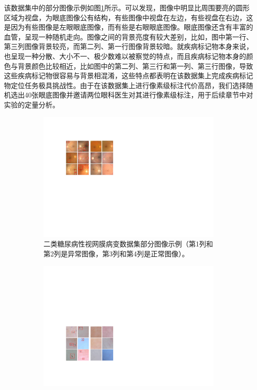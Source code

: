 该数据集中的部分图像示例如图\ref{subfig:bin_dr_ds_example}所示。可以发现，图像中明显比周围要亮的圆形区域为视盘，为眼底图像公有结构，有些图像中视盘在左边，有些视盘在右边，这是因为有些图像是左眼眼底图像，而有些是右眼眼底图像。眼底图像还含有丰富的血管，呈现一种随机走向。图像之间的背景亮度有较大差别，比如，图中第一行、第三列图像背景较亮，而第二列、第一行图像背景较暗。就疾病标记物本身来说，也呈现一种分散、大小不一、极少数难以被察觉的特点，而且疾病标记物本身的颜色与背景颜色比较相近，比如图中的第二列、第三行和第一列、第三行图像，导致这些疾病标记物很容易与背景相混淆，这些特点都表明在该数据集上完成疾病标记物定位任务极具挑战性。由于在该数据集上进行像素级标注代价高昂，我们选择随机选出40张眼底图像并邀请两位眼科医生对其进行像素级标注，用于后续章节中对实验的定量分析。

\begin{figure}[h!]
	\centering
	\begin{subfigure}{0.48\textwidth}
		\centering
		\includegraphics[width=1\textwidth]{figure/bin_dr_ds_example}
		\caption{二类糖尿病性视网膜病变数据集部分图像示例（第1列和第2列是异常图像，第3列和第4列是正常图像）。}
		\label{subfig:bin_dr_ds_example}
	\end{subfigure}
	\quad
	\begin{subfigure}{0.48\textwidth}
		\centering
		\includegraphics[width=1\textwidth]{figure/bin_simulate_skin_example}

\end{subfigure}
\end{figure}
